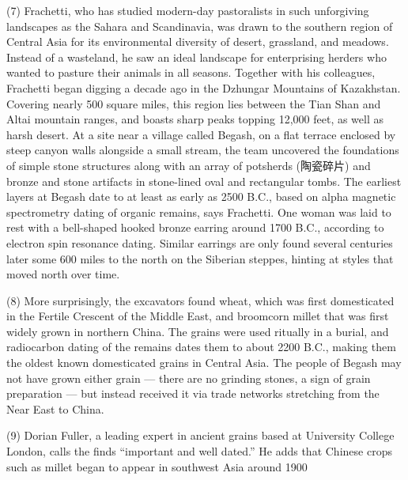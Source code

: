 \documentclass[UTF8,11pt]{ctexart}
\begin{document}
(7) Frachetti, who has studied modern-day pastoralists in such unforgiving landscapes as the Sahara and Scandinavia, was drawn to the southern region of Central Asia for its environmental diversity of desert, grassland, and meadows. Instead of a wasteland, he saw an ideal landscape for enterprising herders who wanted to pasture their animals in all seasons. Together with his colleagues, Frachetti began digging a decade ago in the Dzhungar Mountains of Kazakhstan. Covering nearly 500 square miles, this region lies between the Tian Shan and Altai mountain ranges, and boasts sharp peaks topping 12,000 feet, as well as harsh desert. At a site near a village called Begash, on a flat terrace enclosed by steep canyon walls alongside a small stream, the team uncovered the foundations of simple stone structures along with an array of potsherds (陶瓷碎片) and bronze and stone artifacts in stone-lined oval and rectangular tombs. The earliest layers at Begash date to at least as early as 2500 B.C., based on alpha magnetic spectrometry dating of organic remains, says Frachetti. One woman was laid to rest with a bell-shaped hooked bronze earring around 1700 B.C., according to electron spin resonance dating. Similar earrings are only found several centuries later some 600 miles to the north on the Siberian steppes, hinting at styles that moved north over time.


(8) More surprisingly, the excavators found wheat, which was first domesticated in the Fertile Crescent of the Middle East, and broomcorn millet that was first widely grown in northern China. The grains were used ritually in a burial, and radiocarbon dating of the remains dates them to about 2200 B.C., making them the oldest known domesticated grains in Central Asia. The people of Begash may not have grown either grain — there are no grinding stones, a sign of grain preparation — but instead received it via trade networks stretching from the Near East to China.


(9) Dorian Fuller, a leading expert in ancient grains based at University College London, calls the finds “important and well dated.” He adds that Chinese crops such as millet began to appear in southwest Asia around 1900
\end{document}
